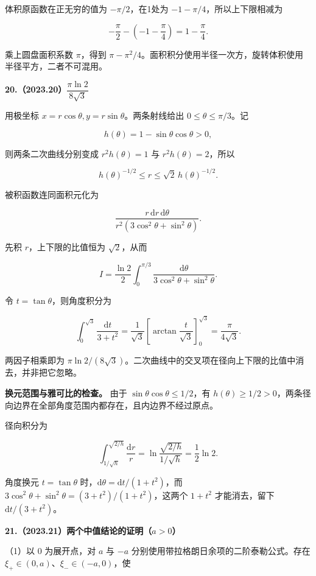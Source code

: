 \documentclass[UTF8,11pt,fontset=windows]{ctexart}
\begin{document}
体积原函数在正无穷的值为 $-\pi/2$，在1处为 $-1-\pi/4$，所以上下限相减为

$$
-\frac\pi2-\left(-1-\frac\pi4\right)=1-\frac\pi4.
$$

乘上圆盘面积系数 $\pi$，得到 $\pi-\pi^2/4$。面积积分使用半径一次方，旋转体积使用半径平方，二者不可混用。

\clearpage

\textbf{20.（2023.20）$\dfrac{\pi\ln2}{8\sqrt3}$}

用极坐标 $x=r\cos\theta,y=r\sin\theta$。两条射线给出 $0\le\theta\le\pi/3$。记

$$
h(\theta)=1-\sin\theta\cos\theta>0,
$$

则两条二次曲线分别变成 $r^2h(\theta)=1$ 与 $r^2h(\theta)=2$，所以

$$
h(\theta)^{-1/2}\le r\le\sqrt2\,h(\theta)^{-1/2}.
$$

被积函数连同面积元化为

$$
\frac{r\,\mathrm dr\,\mathrm d\theta}{r^2(3\cos^2\theta+\sin^2\theta)}.
$$

先积 $r$，上下限的比值恒为 $\sqrt2$，从而

$$
I=\frac{\ln2}{2}\int_0^{\pi/3}\frac{\mathrm d\theta}{3\cos^2\theta+\sin^2\theta}.
$$

令 $t=\tan\theta$，则角度积分为

$$
\int_0^{\sqrt3}\frac{\mathrm dt}{3+t^2}
=\frac1{\sqrt3}\left[\arctan\frac t{\sqrt3}\right]_0^{\sqrt3}
=\frac\pi{4\sqrt3}.
$$

两因子相乘即为 $\pi\ln2/(8\sqrt3)$。二次曲线中的交叉项在径向上下限的比值中消去，并非把它忽略。

\textbf{换元范围与雅可比的检查。} 由于 $\sin\theta\cos\theta\le1/2$，有 $h(\theta)\ge1/2>0$，两条径向边界在全部角度范围内都存在，且内边界不经过原点。

径向积分为

$$
\int_{1/\sqrt h}^{\sqrt{2/h}}\frac{\mathrm dr}{r}
=\ln\frac{\sqrt{2/h}}{1/\sqrt h}=\frac12\ln2.
$$

角度换元 $t=\tan\theta$ 时，$\mathrm d\theta=\mathrm dt/(1+t^2)$，而 $3\cos^2\theta+\sin^2\theta=(3+t^2)/(1+t^2)$，这两个 $1+t^2$ 才能消去，留下 $\mathrm dt/(3+t^2)$。

\clearpage

\textbf{21.（2023.21）两个中值结论的证明（$a>0$）}

（1）以 $0$ 为展开点，对 $a$ 与 $-a$ 分别使用带拉格朗日余项的二阶泰勒公式。存在 $\xi_+\in(0,a)$、$\xi_-\in(-a,0)$，使
\end{document}
